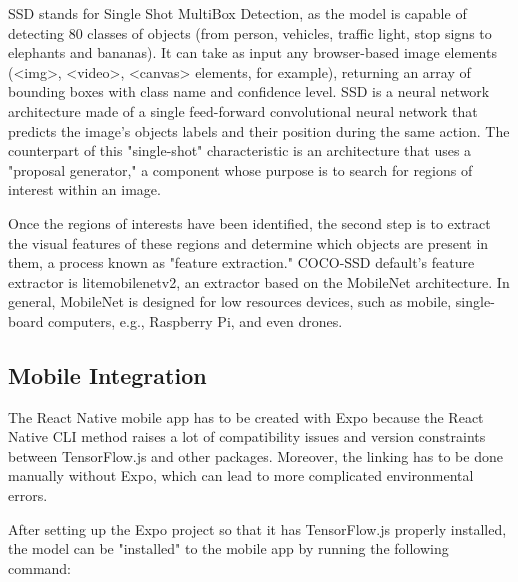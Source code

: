 \documentclass[runningheads,a4paper,11pt]{report}
\begin{document}
SSD stands for Single Shot MultiBox Detection, as the model is capable of detecting 80 classes of objects (from person, vehicles, traffic light, stop signs to elephants and bananas). It can take as input any browser-based image elements (<img>, <video>, <canvas> elements, for example), returning an array of bounding boxes with class name and confidence level. SSD is a neural network architecture made of a single feed-forward convolutional neural network that predicts the image's objects labels and their position during the same action. The counterpart of this "single-shot" characteristic is an architecture that uses a "proposal generator," a component whose purpose is to search for regions of interest within an image.

Once the regions of interests have been identified, the second step is to extract the visual features of these regions and determine which objects are present in them, a process known as "feature extraction." COCO-SSD default's feature extractor is lite\textunderscore mobilenet\textunderscore v2, an extractor based on the MobileNet architecture. In general, MobileNet is designed for low resources devices, such as mobile, single-board computers, e.g., Raspberry Pi, and even drones.

\subsection{Mobile Integration}
\label{section:mobileIntegration}

The React Native mobile app has to be created with Expo because the React Native CLI method raises a lot of compatibility issues and version constraints between TensorFlow.js and other packages. Moreover, the linking has to be done manually without Expo, which can lead to more complicated environmental errors. 


After setting up the Expo project so that it has TensorFlow.js properly installed, the model can be "installed" to the mobile app by running the following command:
\end{document}
